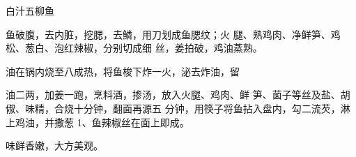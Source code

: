 \begin{recipe}{白汁五柳鱼}

\ingredients


\cooking

\step 	鱼破腹，去内脏，挖腮，去鱗，用刀划成鱼腮纹；火 腿、熟鸡肉、净鲜笋、鸡松、葱白、泡红辣椒，分别切成细 丝，姜拍破，鸡油蒸熟。

\step 	油在锅内烧至八成热，将鱼梭下炸一火，泌去炸油，留

油二两，加姜一跑，烹料酒，掺汤，放入火腿、鸡肉、鲜 笋、菌子等丝及盐、胡俶、味精，合烧十分钟，翻面再源五 分钟，用筷子将鱼拈入盘内，勾二流芡，淋上鸡油，并撒葱 1、鱼辣椒丝在面上即成。

\notes

味鲜香嫩，大方美观。

\end{recipe}

